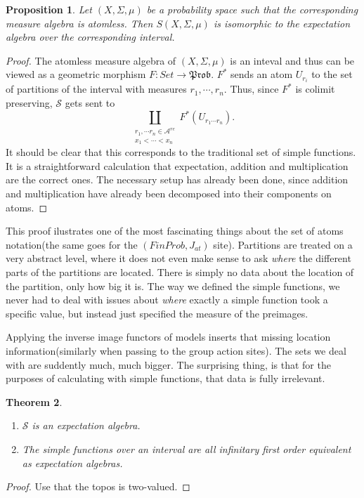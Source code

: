 \documentclass[a4paper]{amsproc}
\theoremstyle{plain}
\newtheorem{theorem}{Theorem}[section]
\newtheorem{proposition}[theorem]{Proposition}
\theoremstyle{definition}
\theoremstyle{remark}
\numberwithin{equation}{section}
\begin{document}
\begin{proposition}
    Let $(X, \Sigma, \mu)$ be a probability space such that the corresponding measure algebra is atomless. Then $S(X,\Sigma,\mu)$ is isomorphic to the expectation algebra over the corresponding interval.
\end{proposition}
\begin{proof}
    The atomless measure algebra of $(X, \Sigma, \mu)$ is an inteval and thus can be viewed as a geometric morphism $F: Set \to \mathfrak{Prob}$. $F^*$ sends an atom $U_{r_i}$ to the set of partitions of the interval with measures $r_1,\cdots,r_n$. Thus, since $F^*$ is colimit preserving, $\mathcal{S}$ gets sent to
    \[
        \coprod_{\substack{r_1, \cdots r_n \in \mathcal{A}^{re} \\ x_1 < \cdots < x_n}} F^*(U_{r_1\cdots r_n}) .
    \]
    It should be clear that this corresponds to the traditional set of simple functions. It is a straightforward calculation that expectation, addition and multiplication are the correct ones. The necessary setup has already been done, since addition and multiplication have already been decomposed into their components on atoms.
\end{proof}

This proof ilustrates one of the most fascinating things about the set of atoms notation(the same goes for the $(FinProb, J_{at})$ site). Partitions are treated on a very abstract level, where it does not even make sense to ask \emph{where} the different parts of the partitions are located. There is simply no data about the location of the partition, only how big it is. The way we defined the simple functions, we never had to deal with issues about \emph{where} exactly a simple function took a specific value, but instead just specified the measure of the preimages.

Applying the inverse image functors of models inserts that missing location information(similarly when passing to the group action sites). The sets we deal with are suddently much, much bigger. The surprising thing, is that for the purposes of calculating with simple functions, that data is fully irrelevant.

\begin{theorem}
    \begin{enumerate}
    \item $\mathcal{S}$ is an expectation algebra.
    \item The simple functions over an interval are all infinitary first order equivalent as expectation algebras.
    \end{enumerate}
\end{theorem}
\begin{proof}
    Use that the topos is two-valued.
\end{proof}
\end{document}

